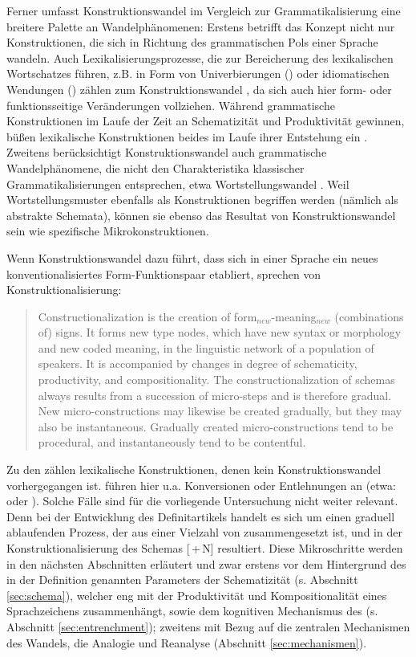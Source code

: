 Ferner umfasst Konstruktionswandel im Vergleich zur Grammatikalisierung  eine breitere Palette an Wandelphänomenen: Erstens betrifft das Konzept nicht nur Konstruktionen, die sich in Richtung des grammatischen Pols einer Sprache wandeln. Auch Lexikalisierungsprozesse, die zur Bereicherung des lexikalischen Wortschatzes führen, z.B. in Form von Univerbierungen () oder idiomatischen Wendungen () zählen zum Konstruktionswandel \parencite[64]{Hilpert2011}, da sich auch hier form- oder funktionsseitige Veränderungen vollziehen. Während grammatische Konstruktionen im Laufe der Zeit an Schematizität und Produktivität gewinnen, büßen lexikalische Konstruktionen beides im Laufe ihrer Entstehung ein \parencite[vgl.][164]{Traugott2013}. Zweitens berücksichtigt Konstruktionswandel auch grammatische Wandelphänomene, die nicht den Charakteristika klassischer Grammatikalisierungen entsprechen, etwa Wortstellungswandel \parencite[vgl.][65]{Hilpert2011}. Weil Wortstellungsmuster ebenfalls als Konstruktionen begriffen werden (nämlich als abstrakte Schemata), können sie ebenso das Resultat von Konstruktionswandel sein wie spezifische Mikrokonstruktionen. 

Wenn Konstruktionswandel dazu führt, dass sich in einer Sprache ein neues konventionalisiertes Form-Funktionspaar etabliert, sprechen \textcite{Traugott2013} von Konstruktionalisierung: \blockcquote[22]{Traugott2013}{Constructionalization is the creation of form$_{new}$-meaning$_{new}$ (combinations of) signs. It forms new type nodes, which have new syntax or morphology and new coded meaning, in the linguistic network of a population of speakers. It is accompanied by changes in degree of schematicity,
productivity, and compositionality. The constructionalization of schemas
always results from a succession of micro-steps and is therefore gradual.
New micro-constructions may likewise be created gradually, but they may
also be instantaneous. Gradually created micro-constructions tend to be
procedural, and instantaneously tend to be
contentful.}

\noindent
Zu den  zählen lexikalische Konstruktionen, denen kein Konstruktionswandel vorhergegangen ist. \textcite[3]{Traugott2013} führen hier u.a. Konversionen oder Entlehnungen an (etwa:  oder ). Solche Fälle sind für die vorliegende Untersuchung nicht weiter relevant. Denn bei der Entwicklung des Definitartikels handelt es sich um einen graduell ablaufenden Prozess, der aus einer Vielzahl von  zusammengesetzt ist, und in der Konstruktionalisierung des Schemas  [\,+\,N]  resultiert. Diese Mikroschritte werden in den nächsten Abschnitten erläutert und zwar erstens vor dem Hintergrund des in der Definition genannten Parameters der Schematizität (s. Abschnitt \ref{sec:schema}), welcher eng mit der Produktivität und Kompositionalität eines Sprachzeichens zusammenhängt, sowie dem kognitiven Mechanismus des   (s.  Abschnitt \ref{sec:entrenchment}); zweitens mit Bezug auf die zentralen Mechanismen des Wandels, die Analogie und Reanalyse (Abschnitt \ref{sec:mechanismen}). 

